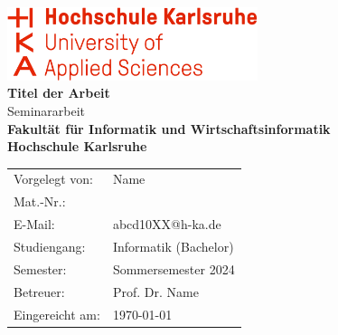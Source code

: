 
\begin{titlepage}
	\begin{center}
		\includegraphics[width=0.55\textwidth]{Images/Template/HKA_banner.png}\\[16ex]
		\huge{\textbf{Titel der Arbeit}\\Seminararbeit}\\[4ex]
		\large{\textbf{Fakultät für Informatik und Wirtschaftsinformatik}}\\[2ex]
		\large{\textbf{Hochschule Karlsruhe}}\\[22ex]
		\normalsize{}
		\begin{tabular}{ll}
			Vorgelegt von: & \quad\quad\quad Name\\[0.7ex]
			Mat.-Nr.: & \quad\quad\quad 123456 \\[0.7ex]
			E-Mail: & \quad\quad\quad abcd10XX@h-ka.de\\[0.7ex]
			Studiengang: & \quad\quad\quad Informatik (Bachelor)\\[2ex]
			Semester: & \quad\quad\quad Sommersemester 2024\\[2ex]
			Betreuer: & \quad\quad\quad Prof. Dr. Name\\[2ex]
			Eingereicht am: & \quad\quad\quad\today\\[2ex]
		\end{tabular}
	\end{center}
\end{titlepage}
